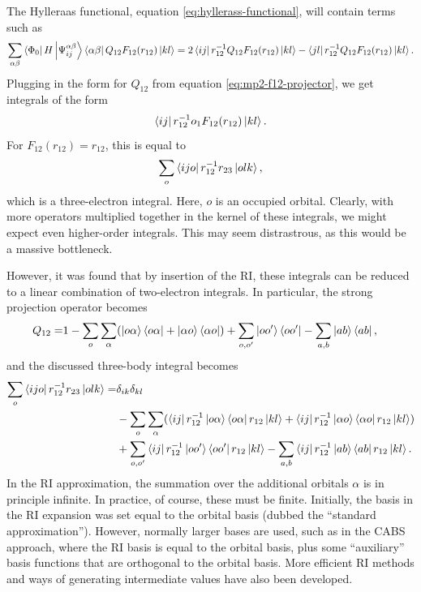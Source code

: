 The Hylleraas functional, equation \ref{eq:hyllerass-functional}, will contain terms such as
\begin{equation}
    \sum_{\alpha\beta}\bra{\Phi_0}H\ket{\Psi_{ij}^{\alpha\beta}} \bra{\alpha\beta}Q_{12}F_{12}(r_{12})\ket{kl} = 2\bra{ij}r_{12}^{-1}Q_{12}F_{12}(r_{12})\ket{kl} - \bra{jl}r_{12}^{-1}Q_{12}F_{12}(r_{12})\ket{kl}.
\end{equation}
Plugging in the form for $Q_{12}$ from equation \ref{eq:mp2-f12-projector}, we get integrals of the form
\begin{equation}
    \bra{ij}r_{12}^{-1}o_1F_{12}(r_{12})\ket{kl}.
\end{equation}
For $F_{12}(r_{12})=r_{12}$, this is equal to
\begin{equation}
    \sum_o\bra{ijo}r_{12}^{-1}r_{23}\ket{olk},
\end{equation}
which is a three-electron integral. Here, $o$ is an occupied orbital. Clearly, with more operators multiplied together in the kernel of these integrals, we might expect even higher-order integrals. This may seem distrastrous, as this would be a massive bottleneck.

However, it was found that by insertion of the \gls{RI}, these integrals can be reduced to a linear combination of two-electron integrals. In particular, the strong projection operator becomes
\begin{equation}
\begin{split}
    Q_{12} =& 1 - \sum_o\sum_\alpha (\ket{o\alpha}\bra{o\alpha} + \ket{\alpha o}\bra{\alpha o})
            + \sum_{o,o'}\ket{oo'}\bra{oo'} - \sum_{a,b}\ket{ab}\bra{ab},
\end{split}
\end{equation}
and the discussed three-body integral becomes
\begin{equation}
\begin{split}
    \sum_o\bra{ijo}r_{12}^{-1}r_{23}\ket{olk} =& \delta_{ik}\delta_{kl} \\
    &- \sum_{o}\sum_\alpha(\bra{ij}r_{12}^{-1}\ket{o\alpha}\bra{o\alpha}r_{12}\ket{kl} + \bra{ij}r_{12}^{-1}\ket{\alpha o}\bra{\alpha o}r_{12}\ket{kl}) \\
    &+ \sum_{o,o'}\bra{ij}r_{12}^{-1}\ket{oo'}\bra{oo'}r_{12}\ket{kl}
    - \sum_{a,b}\bra{ij}r_{12}^{-1}\ket{ab}\bra{ab}r_{12}\ket{kl}.
\end{split}
\end{equation}
In the \gls{RI} approximation, the summation over the additional orbitals $\alpha$ is in principle infinite. In practice, of course, these must be finite. Initially, the basis in the \gls{RI} expansion was set equal to the orbital basis (dubbed the ``standard approximation''). However, normally larger bases are used, such as in the \gls{CABS} approach, where the \gls{RI} basis is equal to the orbital basis, plus some ``auxiliary'' basis functions that are orthogonal to the orbital basis. More efficient RI methods and ways of generating intermediate values have also been developed.

